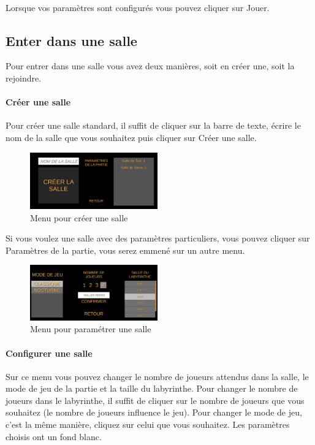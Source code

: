 \documentclass{article}
\begin{document}
\paragraph{}
Lorsque vos paramètres sont configurés vous pouvez cliquer sur Jouer.

\subsection{Enter dans une salle}
Pour entrer dans une salle vous avez deux manières, soit en créer une, soit la rejoindre.
\paragraph{Créer une salle}
Pour créer une salle standard, il suffit de cliquer sur la barre de texte, écrire le nom de la salle que vous souhaitez puis cliquer sur Créer une salle.

\begin{figure}[H]
	\centering
	\includegraphics[width=0.49\textwidth]{Menu1.png}
	\caption{Menu pour créer une salle}
	\label{Menu pour créer une salle}
\end{figure}

Si vous voulez une salle avec des paramètres particuliers, vous pouvez cliquer sur Paramètres de la partie, vous serez emmené sur un autre menu.

\begin{figure}[H]
	\centering
	\includegraphics[width=0.49\textwidth]{Menu2.png}
	\caption{Menu pour paramétrer une salle}
	\label{Menu pour paramétrer une salle}
\end{figure}

\paragraph{Configurer une salle}
Sur ce menu vous pouvez changer le nombre de joueurs attendus dans la salle, le mode de jeu de la partie et la taille du labyrinthe. Pour changer le nombre de joueurs dans le labyrinthe, il suffit de cliquer sur le nombre de joueurs que vous souhaitez (le nombre de joueurs influence le jeu). Pour changer le mode de jeu, c'est la même manière, cliquez sur celui que vous souhaitez. Les paramètres choisis ont un fond blanc. 
\end{document}
